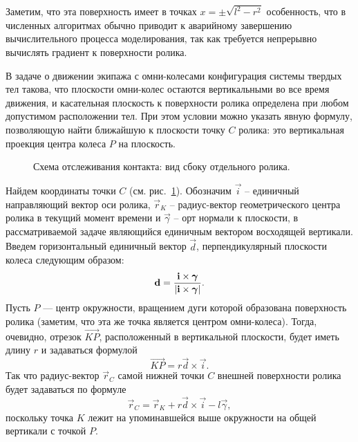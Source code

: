 Заметим, что эта поверхность имеет  в 
точках $x=\pm \sqrt{l^2 - r^2}$ особенность, что в численных алгоритмах обычно приводит к аварийному завершению вычислительного процесса моделирования, так как требуется непрерывно вычислять градиент к поверхности ролика.

В задаче о движении экипажа с омни-колесами конфигурация системы твердых тел такова, что плоскости омни-колес остаются вертикальными во все время движения, и касательная плоскость к поверхности ролика определена при любом допустимом расположении тел. При этом условии можно указать явную формулу, позволяющую найти ближайшую к плоскости точку $C$ ролика: это вертикальная проекция центра колеса $P$ на плоскость.

\begin{figure}[htb]
    \centering
    \caption{Схема отслеживания контакта: вид сбоку отдельного ролика.}
    \label{ContactScheme}
\end{figure}

Найдем координаты точки $C$ (см. рис.~\ref{ContactScheme}). Обозначим $\vec{i}$ -- единичный направляющий вектор оси ролика, $\vec{r}_K$ -- радиус-вектор геометрического центра ролика в текущий момент времени и $\vec{\gamma}$ -- орт нормали к плоскости, в рассматриваемой задаче являющийся единичным вектором восходящей вертикали. Введем горизонтальный единичный вектор $\vec{d}$, перпендикулярный плоскости колеса следующим образом:
$$
    \boldsymbol{\mathbf{d}} = \displaystyle\frac{\displaystyle \boldsymbol{\mathbf{i}} \times \boldsymbol{\mathbf{\gamma}}}{\displaystyle \left| \boldsymbol{\mathbf{i}} \times \boldsymbol{\mathbf{\gamma}} \right|}.
$$
Пусть $P$ --- центр окружности, вращением дуги которой образована поверхность ролика (заметим, что эта же точка является центром омни-колеса). Тогда, очевидно, отрезок $\overrightarrow{KP}$, расположенный в вертикальной
плоскости, будет иметь длину $r$ и задаваться формулой
$$
    \overrightarrow{KP} = r\vec{d} \times \vec{i}.
$$
Так что радиус-вектор $\vec{r}_C$ самой нижней точки $C$ внешней поверхности ролика будет задаваться по формуле
\begin{equation}
    \vec{r}_C = \vec{r}_K + r\vec{d} \times \vec{i} - l\vec{\gamma},
\label{3_2_0}
\end{equation}
поскольку точка $K$ лежит на упоминавшейся выше окружности на общей вертикали с точкой $P$.


